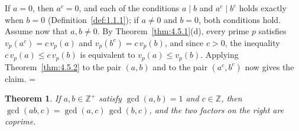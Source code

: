 \documentclass[11pt]{article}
\makeatletter
\theoremstyle{ntstyle}
\newtheorem{theorem}{Theorem}[subsection]
\let\nt@closedisplay\]
\def\nt@guardedclose{\@ifnextchar\par{\nt@closeafterpar}{\@ifnextchar\end{\postdisplaypenalty\@M\nt@closedisplay}{\nt@closedisplay}}}
\def\nt@closeafterpar\par{\@ifnextchar\par{\nt@closeafterpar}{\@ifnextchar\end{\postdisplaypenalty\@M\nt@closedisplay\par}{\nt@closedisplay\par}}}
\renewenvironment{proof}[1][\proofname]{\par
  \pushQED{\qed}\normalfont\topsep\medskipamount\edef\nt@afterproof{\@endparpenalty=\the\@endparpenalty\relax}\@beginparpenalty\@M\@endparpenalty\@M\let\]\nt@guardedclose\trivlist\item[]\textit{#1\@addpunct{.}} \ignorespaces}{\ifvmode\addpenalty\@M\fi\popQED\nt@afterproof\endtrivlist\@endpefalse}
\makeatother
\begin{document}
\begin{proof} If $a=0$, then $a^{c}=0$, and each of the conditions $a\mid b$
	and $a^{c}\mid b^{c}$ holds exactly when $b=0$
	(Definition~\ref{def:1.1.1}); if $a\neq0$ and $b=0$, both conditions hold.
	Assume now that $a,b\neq0$. By Theorem~\ref{thm:4.5.1}(d), every prime $p$
	satisfies $v_p(a^{c})=c\,v_p(a)$ and $v_p(b^{c})=c\,v_p(b)$, and since
	$c>0$, the inequality $c\,v_p(a)\le c\,v_p(b)$ is equivalent to
	$v_p(a)\le v_p(b)$. Applying Theorem~\ref{thm:4.5.2} to the pair $(a,b)$
	and to the pair $(a^{c},b^{c})$ now gives the claim.
\end{proof}
\begin{theorem}\label{thm:4.6.4} If $a,b\in\mathbb{Z}^+$ satisfy $\gcd(a, b) = 1$ and $c\in\mathbb{Z}$, then
	$\gcd(ab, c) = \gcd(a, c)\,\gcd(b, c)$, and the two factors on the
	right are coprime.
\end{theorem}
\end{document}
